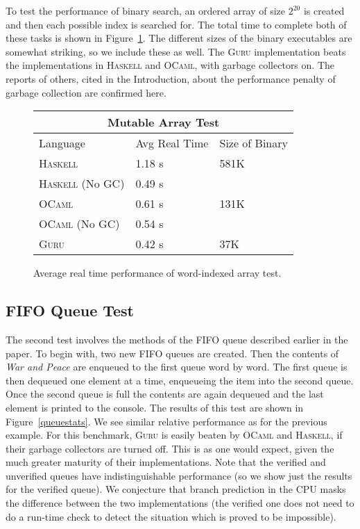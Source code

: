 \documentclass[9pt,natbib]{sigplanconf}
\begin{document}
To test the performance of binary search, an ordered array of size
$2^{20}$ is created and then each possible index is searched for.  The
total time to complete both of these tasks is shown in
Figure~\ref{warraystats}.  The different sizes of the binary
executables are somewhat striking, so we include these as well.  The
\textsc{Guru} implementation beats the implementations in
\textsc{Haskell} and \textsc{OCaml}, with garbage collectors on.  The
reports of others, cited in the Introduction, about the performance
penalty of garbage collection are confirmed here.  

\begin{figure}
\begin{center}
\begin{tabular}{| l | l | l |}
\hline
\multicolumn{3}{|c|}{Mutable Array Test} \\
\hline
Language & Avg Real Time & Size of Binary \\
\hline
\textsc{Haskell} & 1.18 s & 581K \\
\textsc{Haskell} (No GC) & 0.49 s & \  \\
\textsc{OCaml} & 0.61 s & 131K \\
\textsc{OCaml} (No GC) & 0.54 s &\  \\
\textsc{Guru} & 0.42 s & 37K \\
\hline
\end{tabular}
\end{center}
\caption{Average real time performance of word-indexed array test.}
\label{warraystats}
\end{figure}

\subsection{FIFO Queue Test}

The second test involves the methods of the FIFO queue described
earlier in the paper.  To begin with, two new FIFO queues are created.
Then the contents of \textit{War and Peace} are enqueued to the first
queue word by word.  The first queue is then dequeued one element at a
time, enqueueing the item into the second queue.  Once the second
queue is full the contents are again dequeued and the last element is
printed to the console.  The results of this test are shown in
Figure~\ref{queuestats}.  We see similar relative performance as for
the previous example.  For this benchmark, \textsc{Guru} is easily
beaten by \textsc{OCaml} and \textsc{Haskell}, if their garbage
collectors are turned off.  This is as one would expect, given the
much greater maturity of their implementations.  Note that the
verified and unverified queues have indistinguishable performance (so
we show just the results for the verified queue).  We conjecture that
branch prediction in the CPU masks the difference between the two
implementations (the verified one does not need to do a run-time check
to detect the situation which is proved to be impossible).
\end{document}
